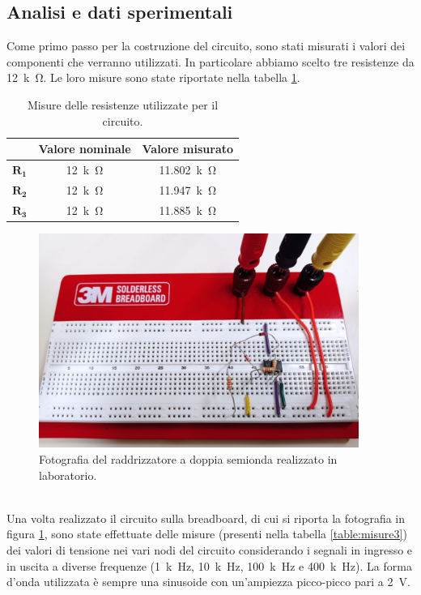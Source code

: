 \documentclass{report}
\begin{document}
\subsection{Analisi e dati sperimentali}
Come primo passo per la costruzione del circuito, sono stati misurati i valori dei componenti che verranno utilizzati. In particolare abbiamo scelto tre resistenze da \SI{12}{k\ohm}. Le loro misure sono state riportate nella tabella \ref{table:mis_res3}.
\begin{table}[h!]
	\centering
	\begin{tabular}{|c|c|c|}
		\cline{2-3} 
		\multicolumn{1}{c|}{} & \textbf{Valore nominale} & \textbf{Valore misurato}\\ 
		\hline
		$\mathbf{R_1}$ & \SI{12}{k\ohm} & \SI{11.802}{k\ohm} \\ 
		\hline
		$\mathbf{R_2}$ & \SI{12}{k\ohm} & \SI{11.947}{k\ohm} \\ 
		\hline
		$\mathbf{R_3}$ & \SI{12}{k\ohm} & \SI{11.885}{k\ohm} \\ 
		\hline
	\end{tabular}
	\caption{Misure delle resistenze utilizzate per il circuito.}
	\label{table:mis_res3}
\end{table}
\begin{figure}[h!]
	\centering
	\includegraphics[height=7cm]{immagini/circuito3}
	\caption{Fotografia del raddrizzatore a doppia semionda realizzato in laboratorio.}
	\label{figura:circuito3}
\end{figure}
\\Una volta realizzato il circuito sulla breadboard, di cui si riporta la fotografia in figura \ref{figura:circuito3}, sono state effettuate delle misure (presenti nella tabella \ref{table:misure3}) dei valori di tensione nei vari nodi del circuito considerando i segnali in ingresso e in uscita a diverse frequenze (\SI{1}{k\hertz}, \SI{10}{k\hertz}, \SI{100}{k\hertz} e \SI{400}{k\hertz}). La forma d'onda utilizzata è sempre una sinusoide con un'ampiezza picco-picco pari a \SI{2}{\volt}.
\end{document}
